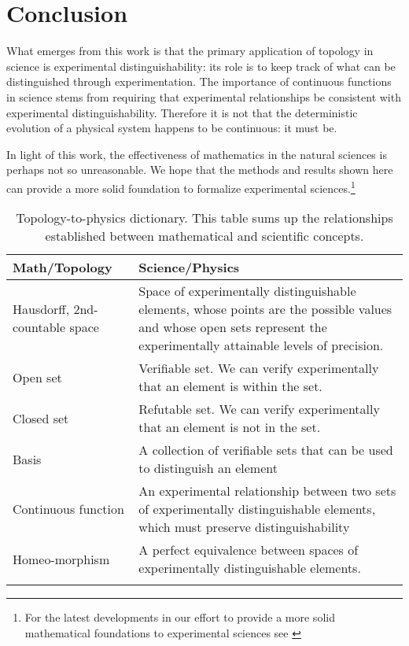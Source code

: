 \documentclass{amsart}
\theoremstyle{definition}
\numberwithin{equation}{section}
\begin{document}
\section{\bf Conclusion}

What emerges from this work is that the primary application of topology in science is experimental distinguishability: its role is to keep track of what can be distinguished through experimentation. The importance of continuous functions in science stems from requiring that experimental relationships be consistent with experimental distinguishability. Therefore it is not that the deterministic evolution of a physical system happens to be continuous: it must be.

In light of this work, the effectiveness of mathematics in the natural sciences is perhaps not so unreasonable. We hope that the methods and results shown here can provide a more solid foundation to formalize experimental sciences.\footnote{For the latest developments in our effort to provide a more solid mathematical foundations to experimental sciences see \cite{Book}}

\begin{table}[H]
	\centering
	\begin{tabular}{p{} p{}}
		Math/Topology & Science/Physics \\ 
		\hline 
		Hausdorff, 2nd-countable space & Space of experimentally distinguishable elements, whose points are the possible values and whose open sets represent the experimentally attainable levels of precision. \\
		Open set & Verifiable set. We can verify experimentally that an element is within the set.  \\ 
		Closed set & Refutable set. We can verify experimentally that an element is not in the set. \\ 
		Basis & A collection of verifiable sets that can be used to distinguish an element\\
		Continuous \newline function &  An experimental relationship between two sets of experimentally distinguishable elements, which must preserve distinguishability \\
		Homeo-morphism &  A perfect equivalence between spaces of experimentally distinguishable elements. \\
		\\
	\end{tabular} 
	\caption{Topology-to-physics dictionary. This table sums up the relationships established between mathematical and scientific concepts.}
\end{table}
\end{document}
